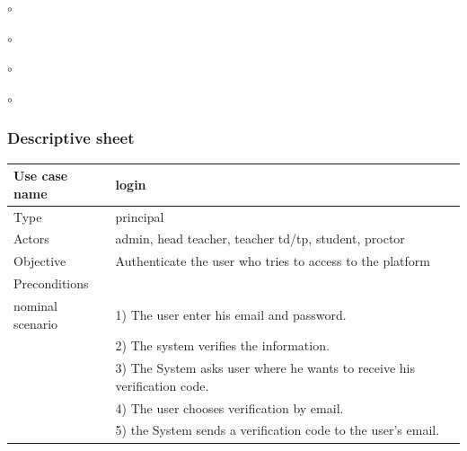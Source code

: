\documentclass[]{uc2pfecaneva}
\begin{document}
\begin{list}{$\circ$}{}
\begin{list}{$\circ$}{}
\begin{list}{$\circ$}{}
\begin{list}{$\circ$}{}
\begin{table}[h]
        \subsubsection{Descriptive sheet}
        \centering
        \begin{tabularx}{\textwidth}{|l|X|}
            \hline
            Use case name         & login                                                                                                                                                                \\ \hline
            Type                  & principal                                                                                                                                                            \\ \hline
            Actors                & admin, head teacher, teacher td/tp, student, proctor                                                                                                                 \\ \hline
            Objective             & Authenticate the user who tries to access to the platform                                                                                                            \\ \hline
            Preconditions         &                                                                                                                                                                      \\ \hline
            nominal scenario
            & 1) The user enter his email and password.                                                                                                                            \\
            & 2) The system verifies the information.                                                                                                                              \\
            & 3) The System asks user where he wants to receive his verification code.                                                                                             \\
            & 4) The user chooses verification by email.                                                                                                                           \\
            & 5) the System sends a verification code to the user's email.                                                                                                         \\

\end{tabularx}
\end{table}
\end{list}
\end{list}
\end{list}
\end{list}
\end{document}
